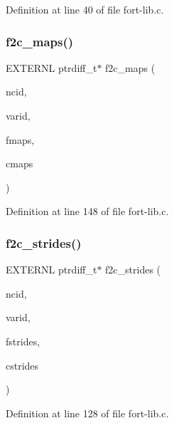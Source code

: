 Definition at line 40 of file fort-\/lib.\+c.

\mbox{\label{fort-lib_8h_a67f01ea998846113dc84243e0f0e1201}} 
\subsubsection{\texorpdfstring{f2c\+\_\+maps()}{f2c\_maps()}}
{\footnotesize\ttfamily E\+X\+T\+E\+R\+NL ptrdiff\+\_\+t$\ast$ f2c\+\_\+maps (\begin{DoxyParamCaption}\item[{int}]{ncid,  }\item[{int}]{varid,  }\item[{const \hyperlink{ncfortran_8h_a0fd3f9e9fc30661142a1fb549af678e7}{N\+F\+\_\+\+I\+N\+T\+E\+G\+ER} $\ast$}]{fmaps,  }\item[{ptrdiff\+\_\+t $\ast$}]{cmaps }\end{DoxyParamCaption})}



Definition at line 148 of file fort-\/lib.\+c.

\mbox{\label{fort-lib_8h_acdc8897d97daefc13edaadd990b8a566}} 
\subsubsection{\texorpdfstring{f2c\+\_\+strides()}{f2c\_strides()}}
{\footnotesize\ttfamily E\+X\+T\+E\+R\+NL ptrdiff\+\_\+t$\ast$ f2c\+\_\+strides (\begin{DoxyParamCaption}\item[{int}]{ncid,  }\item[{int}]{varid,  }\item[{const \hyperlink{ncfortran_8h_a0fd3f9e9fc30661142a1fb549af678e7}{N\+F\+\_\+\+I\+N\+T\+E\+G\+ER} $\ast$}]{fstrides,  }\item[{ptrdiff\+\_\+t $\ast$}]{cstrides }\end{DoxyParamCaption})}



Definition at line 128 of file fort-\/lib.\+c.

